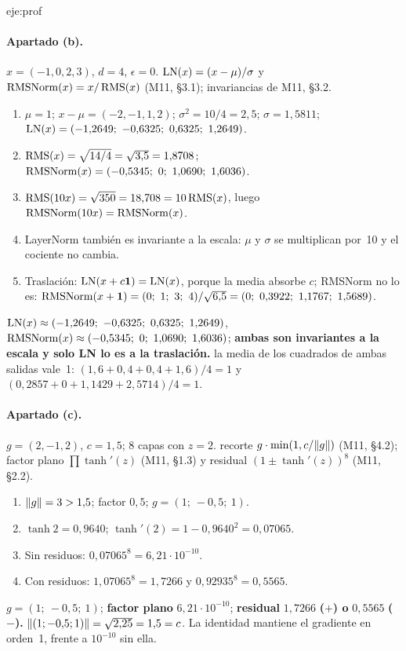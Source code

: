 \begin{solucion}{eje:prof}
\paragraph{Apartado (b).}
\datos $x=(-1,0,2,3)$, $d=4$, $\epsilon=0$.
\planteamiento $\operatorname{LN}(x)=(x-\mu)/\sigma$ y $\operatorname{RMSNorm}(x)=x/\operatorname{RMS}(x)$ (M11, §3.1); invariancias de M11, §3.2.
\pasos
\begin{enumerate}[label=\arabic*.]
  \item $\mu=1$; $x-\mu=(-2,-1,1,2)$; $\sigma^{2}=10/4=2{,}5$; $\sigma=1{,}5811$; $\LN(x)=(-1{,}2649;\allowbreak\ -0{,}6325;\allowbreak\ 0{,}6325;\allowbreak\ 1{,}2649)$.
  \item $\operatorname{RMS}(x)=\sqrt{14/4}=\sqrt{3{,}5}=1{,}8708$; $\RMSNorm(x)=(-0{,}5345;\allowbreak\ 0;\allowbreak\ 1{,}0690;\allowbreak\ 1{,}6036)$.
  \item $\operatorname{RMS}(10x)=\sqrt{350}=18{,}708=10\operatorname{RMS}(x)$, luego $\operatorname{RMSNorm}(10x)=\operatorname{RMSNorm}(x)$.
  \item LayerNorm también es invariante a la escala: $\mu$ y $\sigma$ se multiplican por~10 y el cociente no cambia.
  \item Traslación: $\operatorname{LN}(x+c\mathbf{1})=\operatorname{LN}(x)$, porque la media absorbe $c$; RMSNorm no lo es: $\RMSNorm(x+\uno)=(0;\allowbreak\ 1;\allowbreak\ 3;\allowbreak\ 4)/\sqrt{6{,}5}=(0;\allowbreak\ 0{,}3922;\allowbreak\ 1{,}1767;\allowbreak\ 1{,}5689)$.
\end{enumerate}
\resultado $\LN(x)\approx(-1{,}2649;\allowbreak\ -0{,}6325;\allowbreak\ 0{,}6325;\allowbreak\ 1{,}2649)$, $\RMSNorm(x)\approx(-0{,}5345;\allowbreak\ 0;\allowbreak\ 1{,}0690;\allowbreak\ 1{,}6036)$; \textbf{ambas son invariantes a la escala y solo LN lo es a la traslación.}
\comprobacion la media de los cuadrados de ambas salidas vale~1: $(1{,}6+0{,}4+0{,}4+1{,}6)/4=1$ y $(0{,}2857+0+1{,}1429+2{,}5714)/4=1$.

\paragraph{Apartado (c).}
\datos $g=(2,-1,2)$, $c=1{,}5$; 8 capas con $z=2$.
\planteamiento recorte $g\cdot\min(1,c/\lVert g\rVert)$ (M11, §4.2); factor plano $\prod\tanh'(z)$ (M11, §1.3) y residual $(1\pm\tanh'(z))^{8}$ (M11, §2.2).
\pasos
\begin{enumerate}[label=\arabic*.]
  \item $\lVert g\rVert=3>1{,}5$; factor $0{,}5$; $g=(1;\allowbreak\ -0{,}5;\allowbreak\ 1)$.
  \item $\tanh 2=0{,}9640$; $\tanh'(2)=1-0{,}9640^{2}=0{,}07065$.
  \item Sin residuos: $0{,}07065^{8}=6{,}21\cdot 10^{-10}$.
  \item Con residuos: $1{,}07065^{8}=1{,}7266$ y $0{,}92935^{8}=0{,}5565$.
\end{enumerate}
\resultado $g=(1;\allowbreak\ -0{,}5;\allowbreak\ 1)$; \textbf{factor plano} $6{,}21\cdot 10^{-10}$; \textbf{residual} $1{,}7266$ \textbf{($+$) o} $0{,}5565$ \textbf{($-$).}
\comprobacion $\lVert(1;-0{,}5;1)\rVert=\sqrt{2{,}25}=1{,}5=c$. La identidad mantiene el gradiente en orden~1, frente a $10^{-10}$ sin ella.


\end{solucion}
